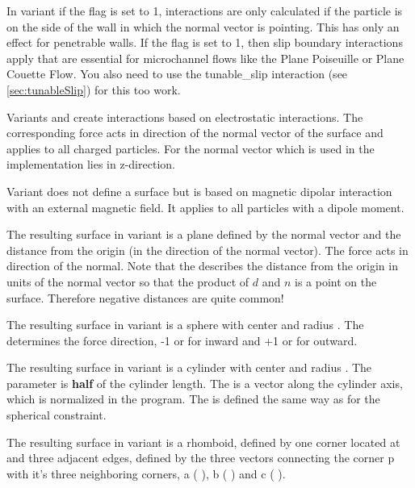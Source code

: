 In variant  if the  flag is set to
1, interactions are only calculated if the particle is on the side of
the wall in which the normal vector is pointing. This has only an
effect for penetrable walls. If the  flag is set
to 1, then slip boundary interactions apply that are essential for
microchannel flows like the Plane Poiseuille or Plane Couette
Flow. You also need to use the tunable_slip interaction (see
\ref{sec:tunableSlip}) for this too work.

Variants  and  create interactions based on electrostatic
interactions. The corresponding force acts in direction of the normal vector of the
surface and applies to all charged particles. For  the normal vector which is used in the implementation lies in z-direction.

Variant  does not define a surface but is based on magnetic
dipolar interaction with an external magnetic field. It applies to all particles
with a dipole moment.

The resulting surface in variant  is a plane defined by the
normal vector    and the distance
 from the origin (in the direction of the normal vector). The force acts in direction of the normal. 
Note that the  describes the distance from the origin in units
of the normal vector so that the product of $d$ and $n$ is a point on the
surface. Therefore negative distances are quite common!

The resulting surface in variant
 is a sphere with center    and radius
. The  determines the force direction, -1 or
 for inward and +1 or  for outward. 

The resulting surface
in variant  is a cylinder with center  
 and radius . The  parameter is \textbf{half} 
of the cylinder length. The  is a
vector along the cylinder axis, which is normalized in the program.
The  is defined the same way as for the spherical
constraint. 

The resulting surface in variant  is a rhomboid, defined by one 
corner located at    and three adjacent edges, 
defined by the three vectors connecting the corner p with it's three neighboring
corners, a (  ), b (  ) 
and c (  ).

